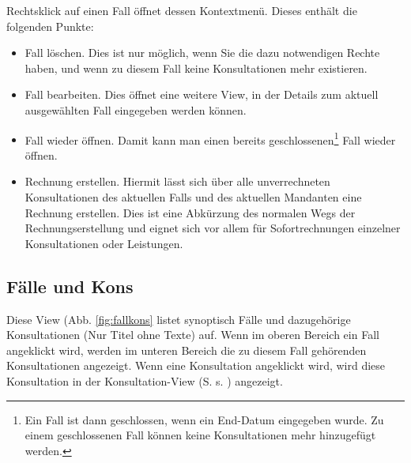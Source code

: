 Rechtsklick auf einen Fall öffnet dessen Kontextmenü. Dieses enthält die
folgenden Punkte:
\begin{itemize}
  \item {Fall löschen}. Dies ist nur möglich, wenn Sie die dazu notwendigen Rechte
  haben, und wenn zu diesem Fall keine Konsultationen mehr existieren.
  \item {Fall bearbeiten}. Dies öffnet eine weitere View, in der Details zum
  aktuell ausgewählten Fall eingegeben werden können.
  \item {Fall wieder öffnen}. Damit kann man einen bereits
  geschlossenen\footnote{Ein Fall ist dann geschlossen, wenn ein End-Datum
  eingegeben wurde. Zu einem geschlossenen Fall können keine Konsultationen mehr
  hinzugefügt werden.} Fall wieder öffnen.
  \item {Rechnung erstellen}. Hiermit lässt sich über alle unverrechneten
  Konsultationen des aktuellen Falls und des aktuellen Mandanten eine Rechnung
  erstellen. Dies ist eine \glqq Abkürzung\grqq{} des normalen Wegs der
  Rechnungserstellung und eignet sich vor allem für Sofortrechnungen einzelner
  Konsultationen oder Leistungen.
\end{itemize}
\subsection{Fälle und Kons}
Diese View (Abb. \ref{fig:fallkons} listet synoptisch Fälle und dazugehörige
Konsultationen (Nur Titel ohne Texte) auf. Wenn im oberen Bereich ein Fall
angeklickt wird, werden im unteren Bereich die zu diesem Fall gehörenden
Konsultationen angezeigt. Wenn eine Konsultation angeklickt wird, wird diese
Konsultation in der Konsultation-View (S. s. \pageref{konsview}) angezeigt.

